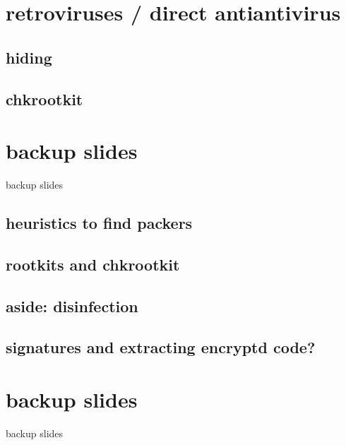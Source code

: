 \section{retroviruses / direct antiantivirus}


\subsection{hiding}


\subsection{chkrootkit}



\section{backup slides}
\begin{frame}{backup slides}
\end{frame}

\subsection{heuristics to find packers}


\subsection{rootkits and chkrootkit}


\subsection{aside: disinfection}


\subsection{signatures and extracting encryptd code?}



\section{backup slides}
\begin{frame}{backup slides}
\end{frame}




